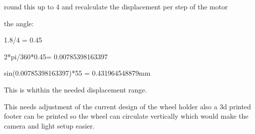 \documentclass{scrartcl}
\begin{document}
round this up to 4 and recalculate the displacement per step of the motor

the angle:

1.8/4 = 0.45

2*pi/360*0.45= 0.00785398163397

sin(0.00785398163397)*55 = 0.431964548879mm



This is whithin the needed displacement range.



This needs adjustment of the current design of the wheel holder also a 3d printed footer can be printed so the wheel can circulate vertically which would make the camera and light setup easier.
\end{document}
